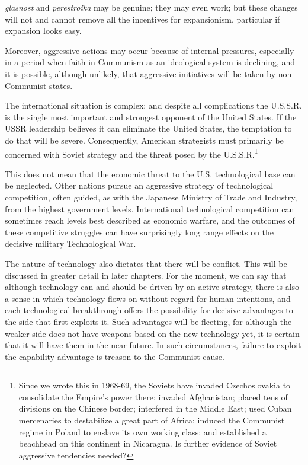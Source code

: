 \textit{glasnost} and \textit{perestroika} may be genuine; they may even work; but these changes will not and cannot remove all the incentives for expansionism, particular if expansion looks easy.

Moreover, aggressive actions may occur because of internal pressures, especially in a period when faith in Communism as an ideological system is declining, and it is possible, although unlikely, that aggressive initiatives will be taken by non-Communist states.

The international situation is complex; and despite all complications the U.S.S.R. is the single most important and strongest opponent of the United States. If the USSR leadership believes it can eliminate the United States, the temptation to do that will be severe. Consequently, American strategists must primarily be concerned with Soviet strategy and the threat posed by the U.S.S.R.\footnote{Since we wrote this in 1968-69, the Soviets have invaded Czechoslovakia to consolidate the Empire's power there; invaded Afghanistan; placed tens of divisions on the Chinese border; interfered in the Middle East; used Cuban mercenaries to destabilize a great part of Africa; induced the Communist regime in Poland to enslave its own working class; and established a beachhead on this continent in Nicaragua. Is further evidence of Soviet aggressive tendencies needed?}

This does not mean that the economic threat to the U.S. technological base can be neglected. Other nations pursue an aggressive strategy of technological competition, often guided, as with the Japanese Ministry of Trade and Industry, from the highest government levels. International technological competition can sometimes reach levels best described as economic warfare, and the outcomes of these competitive struggles can have surprisingly long range effects on the decisive military Technological War.

The nature of technology also dictates that there will be conflict. This will be discussed in greater detail in later chapters. For the moment, we can say that although technology can and should be driven by an active strategy, there is also a sense in which technology flows on without regard for human intentions, and each technological breakthrough offers the possibility for decisive advantages to the side that first exploits it. Such advantages will be fleeting, for although the weaker side does not have weapons based on the new technology yet, it is certain that it will have them in the near future. In such circumstances, failure to exploit the capability advantage is treason to the Communist cause.

